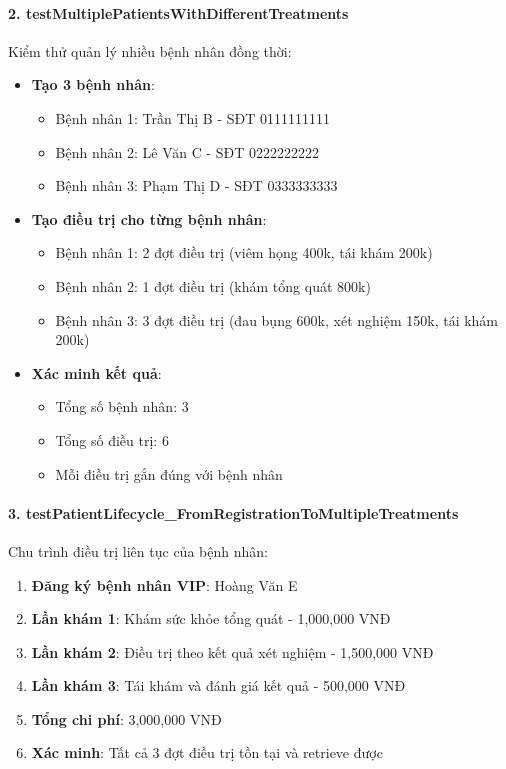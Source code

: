 \paragraph{2. testMultiplePatientsWithDifferentTreatments}

Kiểm thử quản lý nhiều bệnh nhân đồng thời:

\begin{itemize}
    \item \textbf{Tạo 3 bệnh nhân}:
    \begin{itemize}
        \item Bệnh nhân 1: Trần Thị B - SĐT 0111111111
        \item Bệnh nhân 2: Lê Văn C - SĐT 0222222222
        \item Bệnh nhân 3: Phạm Thị D - SĐT 0333333333
    \end{itemize}
    
    \item \textbf{Tạo điều trị cho từng bệnh nhân}:
    \begin{itemize}
        \item Bệnh nhân 1: 2 đợt điều trị (viêm họng 400k, tái khám 200k)
        \item Bệnh nhân 2: 1 đợt điều trị (khám tổng quát 800k)
        \item Bệnh nhân 3: 3 đợt điều trị (đau bụng 600k, xét nghiệm 150k, tái khám 200k)
    \end{itemize}
    
    \item \textbf{Xác minh kết quả}:
    \begin{itemize}
        \item Tổng số bệnh nhân: 3
        \item Tổng số điều trị: 6
        \item Mỗi điều trị gắn đúng với bệnh nhân
    \end{itemize}
\end{itemize}

\paragraph{3. testPatientLifecycle\_FromRegistrationToMultipleTreatments}

Chu trình điều trị liên tục của bệnh nhân:

\begin{enumerate}
    \item \textbf{Đăng ký bệnh nhân VIP}: Hoàng Văn E
    \item \textbf{Lần khám 1}: Khám sức khỏe tổng quát - 1,000,000 VNĐ
    \item \textbf{Lần khám 2}: Điều trị theo kết quả xét nghiệm - 1,500,000 VNĐ
    \item \textbf{Lần khám 3}: Tái khám và đánh giá kết quả - 500,000 VNĐ
    \item \textbf{Tổng chi phí}: 3,000,000 VNĐ
    \item \textbf{Xác minh}: Tất cả 3 đợt điều trị tồn tại và retrieve được
\end{enumerate}

